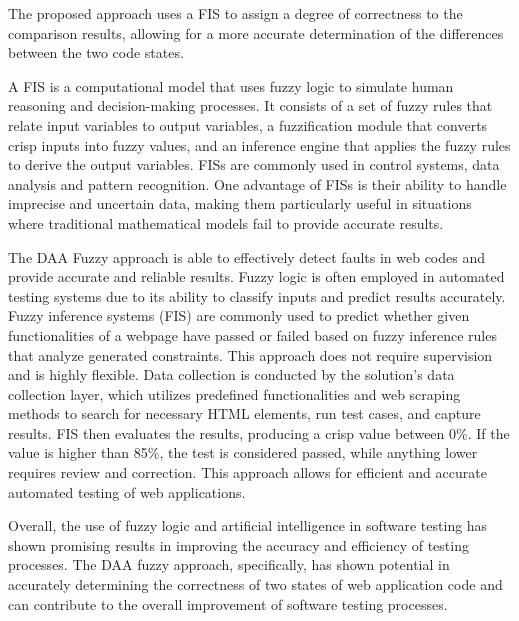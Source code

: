 \documentclass{article}
\begin{document}
The proposed approach uses a FIS to assign a degree of correctness to the comparison results, allowing for a more accurate determination of the differences between the two code states.

A FIS is a computational model that uses fuzzy logic to simulate human reasoning and decision-making processes. It consists of a set of fuzzy rules that relate input variables to output variables, a fuzzification module that converts crisp inputs into fuzzy values, and an inference engine that applies the fuzzy rules to derive the output variables. FISs are commonly used in control systems, data analysis and pattern recognition. One advantage of FISs is their ability to handle imprecise and uncertain data, making them particularly useful in situations where traditional mathematical models fail to provide accurate results.

The DAA Fuzzy approach\cite{fuzzy_ai_in_web_testing} is able to effectively detect faults in web codes and provide accurate and reliable results. Fuzzy logic is often employed in automated testing systems due to its ability to classify inputs and predict results accurately. Fuzzy inference systems (FIS) are commonly used to predict whether given functionalities of a webpage have passed or failed based on fuzzy inference rules that analyze generated constraints. This approach does not require supervision and is highly flexible. Data collection is conducted by the solution's data collection layer, which utilizes predefined functionalities and web scraping methods to search for necessary HTML elements, run test cases, and capture results. FIS then evaluates the results, producing a crisp value between 0\%. If the value is higher than 85\%, the test is considered passed, while anything lower requires review and correction. This approach allows for efficient and accurate automated testing of web applications.

Overall, the use of fuzzy logic and artificial intelligence in software testing has shown promising results in improving the accuracy and efficiency of testing processes. The DAA fuzzy approach, specifically, has shown potential in accurately determining the correctness of two states of web application code and can contribute to the overall improvement of software testing processes.
\end{document}
